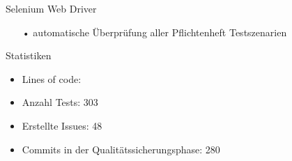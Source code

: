\documentclass[10pt]{beamer}
\begin{document}
\begin{frame}{Selenium Web Driver}
\begin{itemize}
	\item[•] automatische Überprüfung aller Pflichtenheft Testszenarien
\end{itemize}
\end{frame}

\begin{frame}{Statistiken} %
\begin{itemize}
\item Lines of code: 
\item Anzahl Tests: 303
\item Erstellte Issues: 48
\item Commits in der Qualitätssicherungsphase: 280
\end{itemize}
\end{frame}
\end{document}
